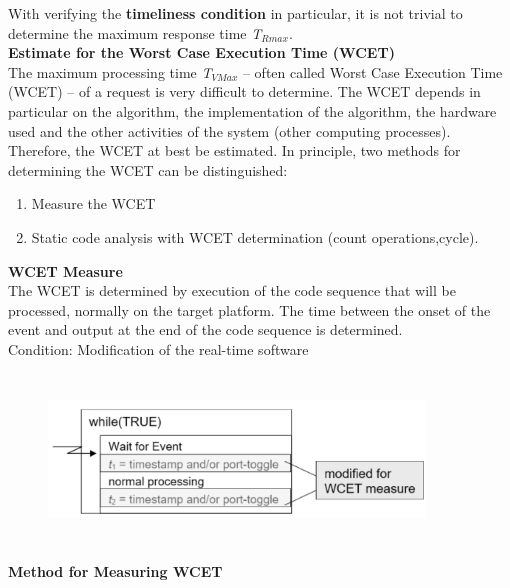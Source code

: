 With verifying the \textbf{timeliness condition} in particular, it is not trivial to determine the maximum response time \textit{T${}_{Rmax}$}.\\

{\rot\bf Estimate for the Worst Case Execution Time (WCET)}\\

The maximum processing time \textit{T${}_{VMax}$} -- often called Worst Case Execution Time (WCET) -- of a request is very difficult to determine. The WCET depends in particular on the algorithm, the implementation of the algorithm, the hardware used and the other activities of the system (other computing processes). \\

Therefore, the WCET at best be estimated. In principle, two methods for determining the WCET can be distinguished:

\begin{enumerate}
	\item  Measure the WCET 
	\item  Static code analysis with WCET determination (count operations,cycle).
\end{enumerate}
\os{\newpage}

{\rot\bf WCET Measure}\\

The WCET is determined by execution of the code sequence that will be processed, normally on the target platform. The time between the onset of the event and output at the end of the code sequence is determined.\\
 
Condition: Modification of the real-time software\\

	\begin{figure}[h]
    \centering
    \includegraphics[width=10cm, height=4.5cm]{Images/image76.png}
    \label{fig:Fig 22}
    \end{figure}
\os{\newpage}

{\rot\bf Method for Measuring WCET}\\

